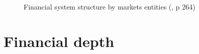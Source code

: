 \documentclass[
  ignorenonframetext,
]{beamer}
\begin{document}
\begin{frame}{}
\label{section-4}
\begin{figure}


\caption{\label{fig-financial-system-structure-markets-col}Financial
system structure by markets entities
(, p
264)}

\end{figure}%
\end{frame}

\section{Financial depth}\label{financial-depth}
\end{document}
